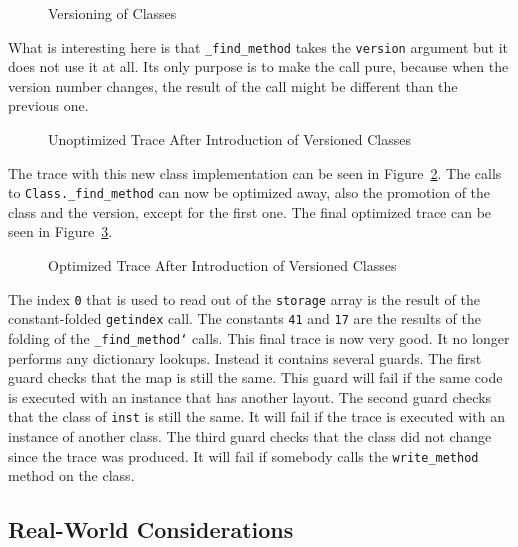 \documentclass{sigplanconf}
\begin{document}
\begin{figure}

\caption{Versioning of Classes}
\label{fig:version}
\end{figure}

What is interesting here is that \texttt{\_find\_method} takes the \texttt{version}
argument but it does not use it at all. Its only purpose is to make the call
pure, because when the version number changes, the result of the call might be
different than the previous one.

\begin{figure}

\caption{Unoptimized Trace After Introduction of Versioned Classes}
\label{fig:trace4}
\end{figure}

The trace with this new class implementation can be seen in
Figure~\ref{fig:trace4}.
The calls to \texttt{Class.\_find\_method} can now be optimized away, also the
promotion of the class and the version, except for the first one. The final
optimized trace can be seen in Figure~\ref{fig:trace5}.

\begin{figure}

\caption{Optimized Trace After Introduction of Versioned Classes}
\label{fig:trace5}
\end{figure}

The index \texttt{0} that is used to read out of the \texttt{storage} array is the result
of the constant-folded \texttt{getindex} call.
The constants \texttt{41} and \texttt{17} are the results of the folding of the
\texttt{\_find\_method`} calls. This final trace is now very good. It no longer performs any
dictionary lookups. Instead it contains several guards. The first guard
checks that the map is still the same. This guard will fail if the same
code is executed with an instance that has another layout. The second guard
checks that the class of \texttt{inst} is still the same. It will fail if the trace is
executed with an instance of another class. The third guard checks that the
class did not change since the trace was produced. It will fail if somebody
calls the \texttt{write\_method} method on the class.



\subsection{Real-World Considerations}
\end{document}
